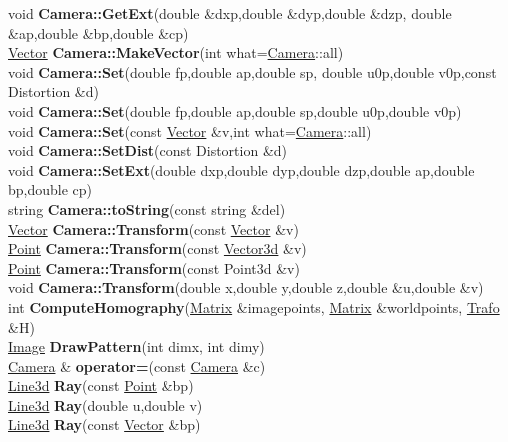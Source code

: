 \documentclass[10pt,titlepage]{article}
\def\functionlistentry#1#2#3#4#5#6{\noindent #1 {\bf #2}(#3) \dotfill #6\\}
\begin{document}
{{\functionlistentry{void}{Camera::GetExt}{double \&dxp,double \&dyp,double \&dzp, double \&ap,double \&bp,double \&cp}{778}{cameraModel}{}
\functionlistentry{\hyperlink{Vector}{Vector}}{Camera::MakeVector}{int what=\hyperlink{Camera}{Camera}::all}{782}{cameraModel}{}
\functionlistentry{void}{Camera::Set}{double fp,double ap,double sp, double u0p,double v0p,const Distortion \&d}{774}{cameraModel}{}
\functionlistentry{void}{Camera::Set}{double fp,double ap,double sp,double u0p,double v0p}{775}{cameraModel}{}
\functionlistentry{void}{Camera::Set}{const \hyperlink{Vector}{Vector} \&v,int what=\hyperlink{Camera}{Camera}::all}{783}{cameraModel}{}
\functionlistentry{void}{Camera::SetDist}{const Distortion \&d}{781}{cameraModel}{}
\functionlistentry{void}{Camera::SetExt}{double dxp,double dyp,double dzp,double ap,double bp,double cp}{776}{cameraModel}{}
\functionlistentry{string}{Camera::toString}{const string \&del}{791}{cameraModel}{}
\functionlistentry{\hyperlink{Vector}{Vector}}{Camera::Transform}{const \hyperlink{Vector}{Vector} \&v}{784}{cameraModel}{}
\functionlistentry{\hyperlink{Point}{Point}}{Camera::Transform}{const \hyperlink{Vector3d}{Vector3d} \&v}{785}{cameraModel}{}
\functionlistentry{\hyperlink{Point}{Point}}{Camera::Transform}{const Point3d \&v}{786}{cameraModel}{}
\functionlistentry{void}{Camera::Transform}{double x,double y,double z,double \&u,double \&v}{787}{cameraModel}{}
\functionlistentry{int}{ComputeHomography}{\hyperlink{Matrix}{Matrix} \&imagepoints, \hyperlink{Matrix}{Matrix} \&worldpoints, \hyperlink{Trafo}{Trafo} \&H}{796}{cameraModel}{}
\functionlistentry{\hyperlink{Image}{Image}}{DrawPattern}{int dimx, int dimy}{801}{cameraModel}{}
\functionlistentry{\hyperlink{Camera}{Camera} \&}{operator=}{const \hyperlink{Camera}{Camera} \&c}{773}{cameraModel}{}
\functionlistentry{\hyperlink{Line3d}{Line3d}}{Ray}{const \hyperlink{Point}{Point} \&bp}{788}{cameraModel}{}
\functionlistentry{\hyperlink{Line3d}{Line3d}}{Ray}{double u,double v}{789}{cameraModel}{}
\functionlistentry{\hyperlink{Line3d}{Line3d}}{Ray}{const \hyperlink{Vector}{Vector} \&bp}{790}{cameraModel}{}

}}
\end{document}
